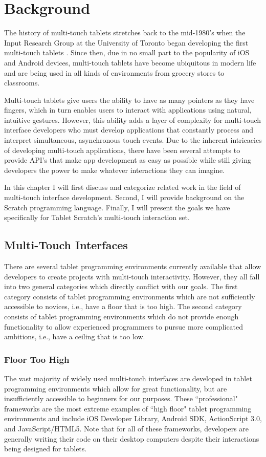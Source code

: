 \chapter{Background}
The history of multi-touch tablets stretches back to the mid-1980's when the Input Research Group at the University of Toronto began developing the first multi-touch tablets \cite{LBS, Mehta}. Since then, due in no small part to the popularity of iOS and Android devices, multi-touch tablets have become ubiquitous in modern life and are being used in all kinds of environments from grocery stores to classrooms.

Multi-touch tablets give users the ability to have as many pointers as they have fingers, which in turn enables users to interact with applications using natural, intuitive gestures. However, this ability adds a layer of complexity for multi-touch interface developers who must develop applications that constantly process and interpret simultaneous, asynchronous touch events. Due to the inherent intricacies of developing multi-touch applications, there have been several attempts to provide API's that make app development as easy as possible while still giving developers the power to make whatever interactions they can imagine.

In this chapter I will first discuss and categorize related work in the field of multi-touch interface development. Second, I will provide background on the Scratch programming language. Finally, I will present the goals we have specifically for Tablet Scratch's multi-touch interaction set.
 
\section{Multi-Touch Interfaces}
There are several tablet programming environments currently available that allow developers to create projects with multi-touch interactivity. However, they all fall into two general categories which directly conflict with our goals. The first category consists of tablet programming environments which are not sufficiently accessible to novices, i.e., have a floor that is too high. The second category consists of tablet programming environments which do not provide enough functionality to allow experienced programmers to pursue more complicated ambitions, i.e., have a ceiling that is too low. 

\subsection{Floor Too High}
The vast majority of widely used multi-touch interfaces are developed in tablet programming environments which allow for great functionality, but are insufficiently accessible to beginners for our purposes. These ``professional" frameworks are the most extreme examples of ``high floor" tablet programming environments and include iOS Developer Library\cite{iOS}, Android SDK\cite{Android}, ActionScript 3.0\cite{ActionScript}, and JavaScript/HTML5\cite{JavaScript}. Note that for all of these frameworks, developers are generally writing their code on their desktop computers despite their interactions being designed for tablets.

